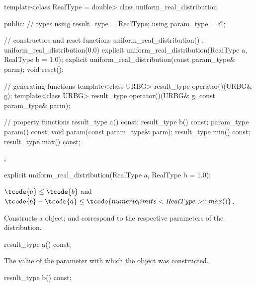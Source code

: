 %
\begin{codeblock}
template<class RealType = double>
  class uniform_real_distribution {
  public:
    // types
    using result_type = RealType;
    using param_type  = @\unspec@;

    // constructors and reset functions
    uniform_real_distribution() : uniform_real_distribution(0.0) {}
    explicit uniform_real_distribution(RealType a, RealType b = 1.0);
    explicit uniform_real_distribution(const param_type& parm);
    void reset();

    // generating functions
    template<class URBG>
      result_type operator()(URBG& g);
    template<class URBG>
      result_type operator()(URBG& g, const param_type& parm);

    // property functions
    result_type a() const;
    result_type b() const;
    param_type param() const;
    void param(const param_type& parm);
    result_type min() const;
    result_type max() const;
  };
\end{codeblock}


%
\begin{itemdecl}
explicit uniform_real_distribution(RealType a, RealType b = 1.0);
\end{itemdecl}

\begin{itemdescr}
\pnum\requires
 $\tcode{a} \leq \tcode{b}$
 and
 $\tcode{b} - \tcode{a} \leq \tcode{numeric_limits<RealType>::max()}$.

\pnum\effects Constructs a  object;
  and 
 correspond to the respective parameters of the distribution.
\end{itemdescr}

%
\begin{itemdecl}
result_type a() const;
\end{itemdecl}

\begin{itemdescr}
\pnum\returns The value of the  parameter
 with which the object was constructed.
\end{itemdescr}

%
\begin{itemdecl}
result_type b() const;
\end{itemdecl}


